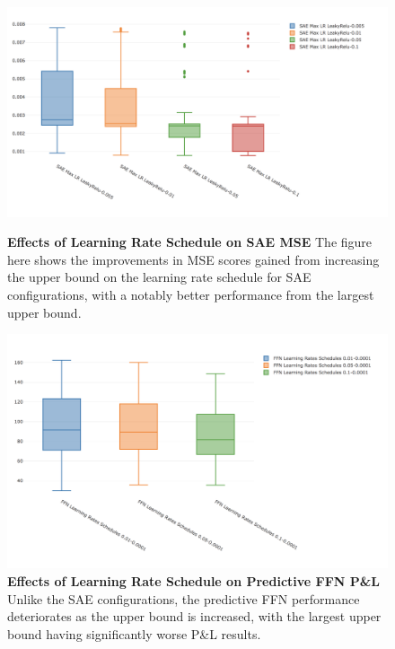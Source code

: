 \documentclass[a4paper,latin]{paper}
\begin{document}
\begin{figure}[H]
	\centering
	\begin{minipage}{0.45\textwidth}
		\centering 
		\includegraphics[scale=0.3]{images/iteration_five/it5_lrsched_sae.png}
		\caption{\textbf{Effects of Learning Rate Schedule on SAE MSE}
			\newline The figure here shows the improvements in MSE scores gained from increasing the upper bound on the learning rate schedule for SAE configurations, with a notably better performance from the largest upper bound.}
		\label{figure-it5_lrsched_sae}
	\end{minipage}\hfill
	\begin{minipage}{0.45\textwidth}
		\centering \includegraphics[scale=0.3]{images/iteration_five/it5_lrsched_ffn.png}
		\caption{\textbf{Effects of Learning Rate Schedule on Predictive FFN P\&L} 
			\newline Unlike the SAE configurations, the predictive FFN performance deteriorates as the upper bound is increased, with the largest upper bound having significantly worse P\&L results.}
		\label{figure-it5_lrsched_ffn}
	\end{minipage}
\end{figure}
\end{document}

